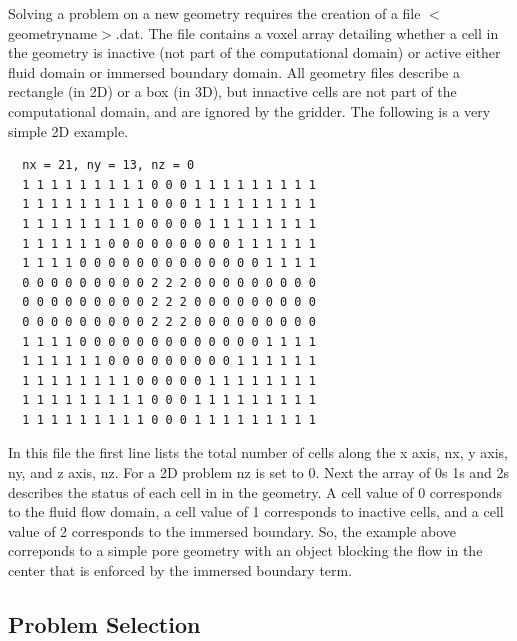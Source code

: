 \documentclass{report}
\begin{document}
Solving a problem on a new geometry requires the creation
of a file $<$geometryname$>$.dat. The file contains
a voxel array detailing whether a cell in the geometry
is inactive (not part of the computational domain) or active either
fluid domain or immersed boundary domain.
All geometry files describe a rectangle (in 2D) or a
box (in 3D), but innactive cells are not part of the computational domain,
and are ignored by the gridder.
The following is a very simple
2D example.
\lstset{style=custom}
\begin{lstlisting}
  nx = 21, ny = 13, nz = 0
  1 1 1 1 1 1 1 1 1 0 0 0 1 1 1 1 1 1 1 1 1
  1 1 1 1 1 1 1 1 1 0 0 0 1 1 1 1 1 1 1 1 1
  1 1 1 1 1 1 1 1 0 0 0 0 0 1 1 1 1 1 1 1 1
  1 1 1 1 1 1 0 0 0 0 0 0 0 0 0 1 1 1 1 1 1
  1 1 1 1 0 0 0 0 0 0 0 0 0 0 0 0 0 1 1 1 1
  0 0 0 0 0 0 0 0 0 2 2 2 0 0 0 0 0 0 0 0 0
  0 0 0 0 0 0 0 0 0 2 2 2 0 0 0 0 0 0 0 0 0
  0 0 0 0 0 0 0 0 0 2 2 2 0 0 0 0 0 0 0 0 0
  1 1 1 1 0 0 0 0 0 0 0 0 0 0 0 0 0 1 1 1 1
  1 1 1 1 1 1 0 0 0 0 0 0 0 0 0 1 1 1 1 1 1
  1 1 1 1 1 1 1 1 0 0 0 0 0 1 1 1 1 1 1 1 1
  1 1 1 1 1 1 1 1 1 0 0 0 1 1 1 1 1 1 1 1 1
  1 1 1 1 1 1 1 1 1 0 0 0 1 1 1 1 1 1 1 1 1

\end{lstlisting}

\noindent In this file the first line lists the total number of cells along the x axis, nx,
y axis, ny,
and z axis, nz. For a 2D problem nz is set to 0.
Next the array of 0s 1s and 2s describes the status of each cell in
in the geometry. A cell value of 0 corresponds to the fluid flow domain,
a cell value of 1 corresponds to inactive cells, and a cell value of 2
corresponds to the immersed boundary. So, the example
above correponds to a simple pore geometry with an object blocking
the flow in the center that is enforced by the immersed boundary term.

\subsection{Problem Selection}
\end{document}

